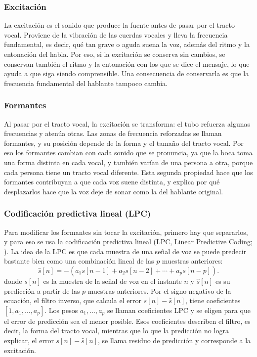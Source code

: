 \documentclass[10pt,twocolumn]{article}
\begin{document}
\subsubsection{Excitación}\label{sec:2.6.1}

La excitación es el sonido que produce la fuente antes de pasar por el tracto vocal. Proviene de la vibración de las cuerdas vocales y lleva la frecuencia fundamental, es decir, qué tan grave o aguda suena la voz, además del ritmo y la entonación del habla. Por eso, si la excitación se conserva sin cambios, se conservan también el ritmo y la entonación con los que se dice el mensaje, lo que ayuda a que siga siendo comprensible. Una consecuencia de conservarla es que la frecuencia fundamental del hablante tampoco cambia.

\subsubsection{Formantes}\label{sec:2.6.2}

Al pasar por el tracto vocal, la excitación se transforma: el tubo refuerza algunas frecuencias y atenúa otras. Las zonas de frecuencia reforzadas se llaman formantes, y su posición depende de la forma y el tamaño del tracto vocal. Por eso los formantes cambian con cada sonido que se pronuncia, ya que la boca toma una forma distinta en cada vocal, y también varían de una persona a otra, porque cada persona tiene un tracto vocal diferente. Esta segunda propiedad hace que los formantes contribuyan a que cada voz suene distinta, y explica por qué desplazarlos hace que la voz deje de sonar como la del hablante original.

\subsubsection{Codificación predictiva lineal (LPC)}\label{sec:2.6.3}

Para modificar los formantes sin tocar la excitación, primero hay que separarlos, y para eso se usa la codificación predictiva lineal (LPC, Linear Predictive Coding; \citealp{makhoul1975,markel1976}). La idea de la LPC es que cada muestra de una señal de voz se puede predecir bastante bien como una combinación lineal de las $p$ muestras anteriores:
\[
\hat{s}[n] = -\left(a_1 s[n-1] + a_2 s[n-2] + \cdots + a_p s[n-p]\right).
\]
\noindent donde $s[n]$ es la muestra de la señal de voz en el instante $n$ y $\hat{s}[n]$ es su predicción a partir de las $p$ muestras anteriores. Por el signo negativo de la ecuación, el filtro inverso, que calcula el error $s[n]-\hat{s}[n]$, tiene coeficientes $[1,a_1,\ldots,a_p]$. Los pesos $a_1,\ldots,a_p$ se llaman coeficientes LPC y se eligen para que el error de predicción sea el menor posible. Esos coeficientes describen el filtro, es decir, la forma del tracto vocal, mientras que lo que la predicción no logra explicar, el error $s[n]-\hat{s}[n]$, se llama residuo de predicción y corresponde a la excitación.
\end{document}
